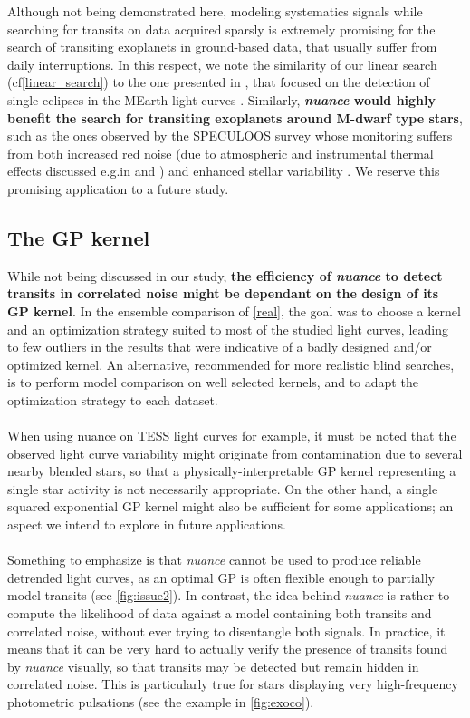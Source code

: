 \documentclass[modern]{aastex631}
\newcommand{\nuancemethod}{\textit{nuance}}
\newcommand{\nuancecode}{\textsf{nuance}}
\begin{document}
Although not being demonstrated here, modeling systematics signals while searching for transits on data acquired sparsly is extremely promising for the search of transiting exoplanets in ground-based data, that usually suffer from daily interruptions. In this respect, we note the similarity of our linear search (cf\;\autoref{linear_search}) to the one presented in \citealt{Berta2012}, that focused on the detection of single eclipses in the MEarth light curves \citep{Irwin2009}. Similarly, \textbf{\nuancemethod{} would highly benefit the search for transiting exoplanets around M-dwarf type stars}, such as the ones observed by the SPECULOOS survey \citep{speculoos} whose monitoring suffers from both increased red noise (due to atmospheric and instrumental thermal effects discussed e.g.\;in \citealt{Berta2012} and  \citealt{Pedersen2023}) and enhanced stellar variability \citep{Murray2020}. We reserve this promising application to a future study.

\subsection{The GP kernel}
While not being discussed in our study, \textbf{the efficiency of \nuancemethod{} to detect transits in correlated noise might be dependant on the design of its GP kernel}. In the ensemble comparison of \autoref{real}, the goal was to choose a kernel and an optimization strategy suited to most of the studied light curves, leading to few outliers in the results that were indicative of a badly designed and/or optimized kernel. An alternative, recommended for more realistic blind searches, is to perform model comparison on well selected kernels, and to adapt the optimization strategy to each dataset.\\\\
When using \nuancecode{} on TESS light curves for example, it must be noted that the observed light curve variability might originate from contamination due to several nearby blended stars, so that a physically-interpretable GP kernel representing a single star activity is not necessarily appropriate. On the other hand, a single squared exponential GP kernel might also be sufficient for some applications; an aspect we intend to explore in future applications.\\\\
Something to emphasize is that \nuancemethod{} cannot be used to produce reliable detrended light curves, as an optimal GP is often flexible enough to partially model transits (see \autoref{fig:issue2}). 
In contrast, the idea behind \nuancemethod{} is rather to compute the likelihood of data against a model containing both transits and correlated noise, without ever trying to disentangle both signals. In practice, it means that it can be very hard to actually verify the presence of transits found by \nuancemethod{} visually, so that transits may be detected but remain hidden in correlated noise. This is particularly true for stars displaying very high-frequency photometric pulsations (see the example in \autoref{fig:exoco}).
\end{document}
